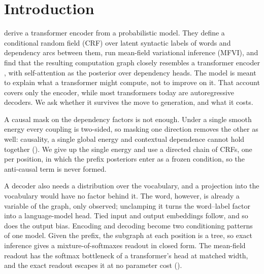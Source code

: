 \section{Introduction}
\label{sec:intro}

\citet{wu2023probabilistic} derive a transformer encoder from a probabilistic model. They define
a conditional random field (CRF) over latent syntactic labels of words and dependency arcs
between them, run mean-field variational inference (MFVI), and find that the resulting
computation graph closely resembles a transformer encoder \citep{vaswani2017attention}, with
self-attention as the posterior over dependency heads. The model is meant to explain what a
transformer might compute, not to improve on it. That account covers only the encoder, while
most transformers today are autoregressive decoders. We ask whether it survives the move to
generation, and what it costs.

A causal mask on the dependency factors is not enough. Under a single smooth energy every
coupling is two-sided, so masking one direction removes the other as well: causality, a single
global energy and contextual dependence cannot hold together (). We give up
the single energy and use a directed chain of CRFs, one per position, in which the prefix
posteriors enter as a frozen condition, so the anti-causal term is never formed.

A decoder also needs a distribution over the vocabulary, and a projection into the vocabulary
would have no factor behind it. The word, however, is already a variable of the graph, only
observed; unclamping it turns the word--label factor into a language-model head. Tied input and
output embeddings follow, and so does the output bias. Encoding and decoding become two
conditioning patterns of one model. Given the prefix, the subgraph at each position is a tree,
so exact inference gives a mixture-of-softmaxes readout in closed form. The mean-field readout
has the softmax bottleneck of a transformer's head at matched width, and the exact readout
escapes it at no parameter cost ().

